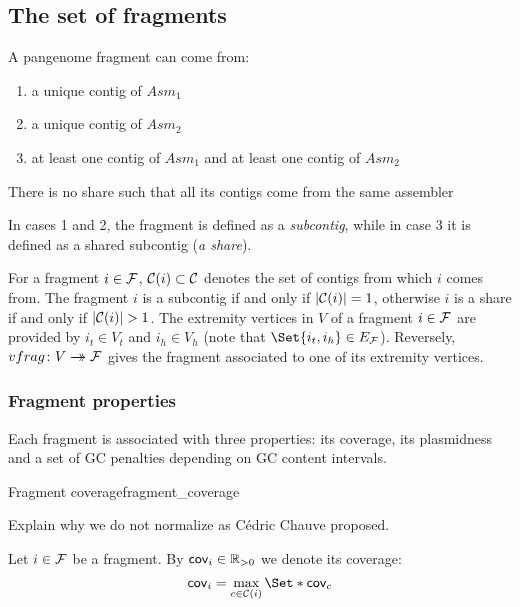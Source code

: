 \subsection{The set of fragments}

A pangenome fragment can come from:

\begin{enumerate}
  \item a unique contig of \(Asm_1\)

  \item a unique contig of \(Asm_2\)

  \item at least one contig of \(Asm_1\) and at least one contig of \(Asm_2\)
\end{enumerate}

\begin{missingproofbox}
  There is no share such that all its contigs come from the same assembler
\end{missingproofbox}

In cases 1 and 2, the fragment is defined as a \emph{subcontig}, while in case 3 it is defined as a shared subcontig (\emph{a share}).

For a fragment \(i \in \mathcal{F}{}\), \(\mathcal{C}{}(i) \subset \mathcal{C}{}\) denotes the set of contigs from which \(i\) comes from. The fragment \(i\) is a subcontig if and only if \(|\mathcal{C}{}(i)| = 1\), otherwise \(i\) is a share if and only if \(|\mathcal{C}{}(i)| > 1\).
The extremity vertices in \(V\) of a fragment \(i \in \mathcal{F}{}\) are provided by \(i_t \in V_t\) and \(i_h \in V_h\) (note that \(\Set{i_t, i_h} \in \EFrags{}\)). Reversely, \(vfrag \colon V \rightarrow\mathrel{\mspace{-15mu}}\rightarrow \mathcal{F}{}\) gives the fragment associated to one of its extremity vertices.

\subsubsection{Fragment properties}

Each fragment is associated with three properties: its coverage, its plasmidness and a set of GC penalties depending on GC content intervals.

\begin{definition}{Fragment coverage}{fragment_coverage}
  \begin{todobox}
    Explain why we do not normalize as Cédric Chauve proposed.
  \end{todobox}
  Let \(i \in \mathcal{F}{}\) be a fragment.
  By \(\mathsf{cov}_{i} \in \mathbb{R}{}_{>0}\) we denote its coverage:
  \[
    \cov{i} = \max_{c \in \Contigs{}(i)}\Set*{\cov{c}}
  \]
\end{definition}

